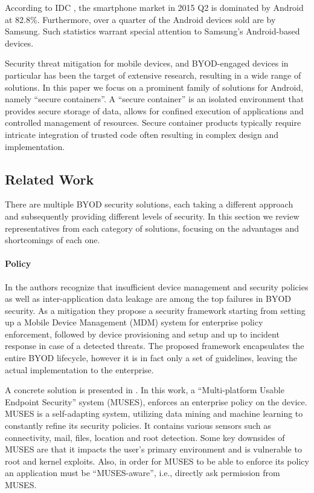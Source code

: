 \documentclass[11pt]{article}
\begin{document}
According to IDC \cite{SmartphoneOsMarketShare}, the smartphone market in 2015 Q2 is dominated by Android at 82.8\%.
Furthermore, over a quarter \cite{SmartphoneVendorMarketShare} of the Android devices sold are by Samsung. Such statistics 
warrant special attention to Samsung's Android-based devices.

Security threat mitigation for mobile devices, and BYOD-engaged devices in particular has been the target of extensive research, resulting
in a wide range of solutions. In this paper we focus on a prominent family of solutions for Android, namely ``secure containers''. A ``secure container''
is an isolated environment that provides secure storage of data, allows for confined execution of applications and controlled management of resources.  
Secure container products typically require intricate integration of trusted code often resulting in complex design and implementation.

\subsection{Related Work} \label{related-work}

There are multiple BYOD security solutions, each taking a different approach and subsequently providing different levels of security.
In this section we review representatives from each category of solutions, focusing on the advantages and shortcomings of each one.

\paragraph{Policy}
In \cite{BYODSecurityEngineering} the authors recognize that insufficient device management and security policies as well as inter-application data 
leakage are among the top failures in BYOD security. As a mitigation they propose a security framework starting from setting up a 
Mobile Device Management (MDM) system for enterprise policy enforcement, followed by device provisioning and setup and up to incident 
response in case of a detected threats. The proposed framework encapsulates the entire BYOD lifecycle, however it is in fact only a set of guidelines, 
leaving the actual implementation to the enterprise.

A concrete solution is presented in \cite{CorporateSecuritySolutionsForBYOD}. 
In this work, a ``Multi-platform Usable Endpoint Security'' system (MUSES), enforces an enterprise policy on the device. 
MUSES is a self-adapting system, utilizing data mining and machine learning to constantly refine its security policies. 
It contains various sensors such as connectivity, mail, files, location and root detection. Some key downsides of MUSES are that 
it impacts the user's primary environment and is vulnerable to root and kernel exploits. Also, in order for MUSES to be able to enforce its policy an 
application must be ``MUSES-aware'', i.e., directly ask permission from MUSES.
\end{document}
